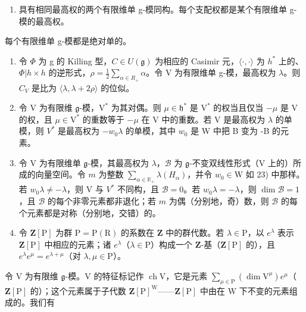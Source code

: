 \begin{enumerate}
\def\labelenumi{\arabic{enumi})}
\setcounter{enumi}{20}
\tightlist
\item
  具有相同最高权的两个有限维单 g-模同构。每个支配权都是某个有限维单 g-模的最高权。
\end{enumerate}

每个有限维单 g-模都是绝对单的。

\begin{enumerate}
\def\labelenumi{\arabic{enumi})}
\setcounter{enumi}{21}
\item
  令 \(\varPhi\) 为 g 的 Killing 型，\(C \in U(\mathfrak{g})\) 为相应的 Casimir 元，\(\langle\cdot,\cdot\rangle\) 为 \(h^{*}\) 上的、\(\varPhi|h \times h\) 的逆形式，\(\rho = \frac{1}{2} \sum_{\alpha \in R_{+}} \alpha\)。令 V 为有限维单 g-模，最高权为 \(\lambda\)。则 \(C_{V}\) 是比为 \(\langle\lambda, \lambda + 2\rho\rangle\) 的位似。
\item
  令 \(\mathrm{V}\) 为有限维 \(\mathfrak{g}\)-模，\(\mathrm{V}^*\) 为其对偶。则 \(\mu \in \mathfrak{h}^*\) 是 \(\mathrm{V}^*\) 的权当且仅当 \(-\mu\) 是 \(\mathrm{V}\) 的权，且 \(\mu \in \mathrm{V}^*\) 的重数等于 \(-\mu\) 在 V 中的重数。若 V 是最高权为 \(\lambda\) 的单模，则 \(V^{*}\) 是最高权为 \(-w_{0}\lambda\) 的单模，其中 \(w_{0}\) 是 W 中把 B 变为 -B 的元素。
\item
  令 \(\mathrm{V}\) 为有限维单 \(\mathfrak{g}\)-模，其最高权为 \(\lambda\)，\(\mathcal{B}\) 为 \(\mathfrak{g}\)-不变双线性形式（\(\mathrm{V}\) 上的）所成的向量空间。令 \(m\) 为整数 \(\sum_{\alpha \in \mathbb{R}_+} \lambda(H_\alpha)\)，并令 \(w_0 \in \mathrm{W}\) 如 23) 中那样。若 \(w_0 \lambda \neq -\lambda\)，则 \(\mathrm{V}\) 与 \(V^*\) 不同构，且 \(\mathcal{B} = 0\)。若 \(w_0 \lambda = -\lambda\)，则 \(\dim \mathcal{B} = 1\)，且 \(\mathcal{B}\) 的每个非零元素都非退化；若 \(m\) 为偶（分别地，奇）数，则 \(\mathcal{B}\) 的每个元素都是对称（分别地，交错）的。
\item
  令 \(\mathbf{Z}[\mathrm{P}]\) 为群 \(\mathrm{P} = \mathrm{P}(\mathrm{R})\) 的系数在 \(\mathbf{Z}\) 中的群代数。若 \(\lambda \in \mathrm{P}\)，以 \(e^{\lambda}\) 表示 \(\mathbf{Z}[\mathrm{P}]\) 中相应的元素；诸 \(e^{\lambda}\)（\(\lambda \in \mathrm{P}\)）构成一个 \(\mathbf{Z}\)-基（\(\mathbf{Z}[\mathrm{P}]\) 的），且 \(e^{\lambda}e^{\mu} = e^{\lambda +\mu}\)（对 \(\lambda, \mu \in \mathrm{P}\)）。
\end{enumerate}

令 \(\mathrm{V}\) 为有限维 \(\mathfrak{g}\)-模。\(\mathrm{V}\) 的特征标记作 \(\operatorname{ch} \mathrm{V}\)，它是元素 \(\sum_{\mu \in \mathrm{P}} (\dim \mathrm{V}^{\mu}) e^{\mu}\)（\(\mathbf{Z}[\mathrm{P}]\) 的）；这个元素属于子代数 \(\mathbf{Z}[\mathrm{P}]^{\mathrm{W}}\)——\(\mathbf{Z}[\mathrm{P}]\) 中由在 \(\mathrm{W}\) 下不变的元素组成的。我们有

